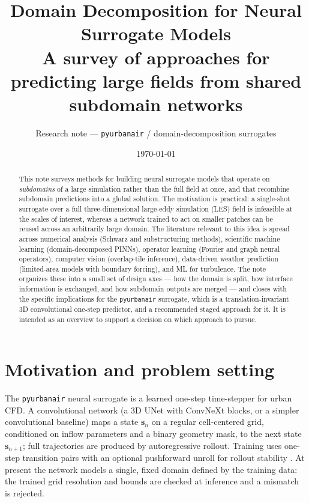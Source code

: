 \documentclass[11pt]{article}
\title{\vspace{-1.2cm}\textbf{Domain Decomposition for Neural Surrogate Models}\\[2pt]
\large A survey of approaches for predicting large fields from shared subdomain networks}
\author{Research note --- \texttt{pyurbanair} / domain-decomposition surrogates}
\date{\today}
\begin{document}
\maketitle
\vspace{-0.6cm}

\begin{abstract}
\noindent
This note surveys methods for building neural surrogate models that operate on
\emph{subdomains} of a large simulation rather than the full field at once, and
that recombine subdomain predictions into a global solution. The motivation is
practical: a single-shot surrogate over a full three-dimensional large-eddy
simulation (LES) field is infeasible at the scales of interest, whereas a
network trained to act on smaller patches can be reused across an arbitrarily
large domain. The literature relevant to this idea is spread across numerical
analysis (Schwarz and substructuring methods), scientific machine learning
(domain-decomposed PINNs), operator learning (Fourier and graph neural
operators), computer vision (overlap-tile inference), data-driven weather
prediction (limited-area models with boundary forcing), and ML for turbulence.
The note organizes these into a small set of design axes --- how the domain is
split, how interface information is exchanged, and how subdomain outputs are
merged --- and closes with the specific implications for the \texttt{pyurbanair}
surrogate, which is a translation-invariant 3D convolutional one-step predictor,
and a recommended staged approach for it. It is intended as an overview to
support a decision on which approach to pursue.
\end{abstract}

\section{Motivation and problem setting}

The \texttt{pyurbanair} neural surrogate is a learned one-step time-stepper for
urban CFD. A convolutional network (a 3D UNet with ConvNeXt blocks, or a simpler
convolutional baseline) maps a state $\mathbf{s}_n$ on a regular cell-centered
grid, conditioned on inflow parameters and a binary geometry mask, to the next
state $\mathbf{s}_{n+1}$; full trajectories are produced by autoregressive
rollout. Training uses one-step transition pairs with an optional pushforward
unroll for rollout stability \cite{brandstetter2022mppde}. At present the
network models a single, fixed domain defined by the training data: the trained
grid resolution and bounds are checked at inference and a mismatch is rejected.
\end{document}
